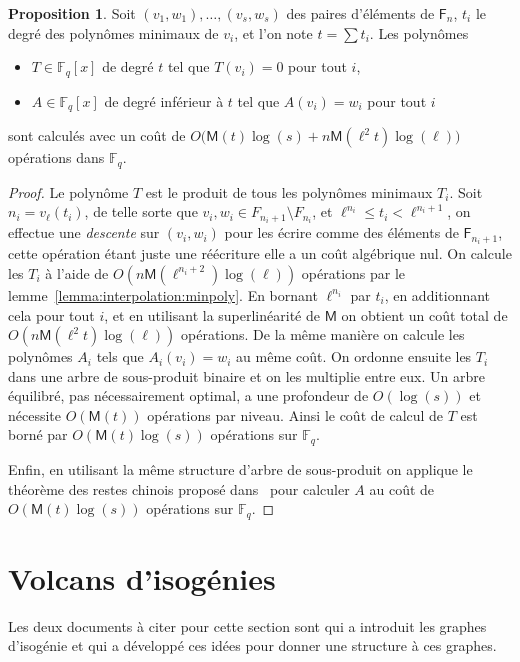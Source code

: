 \documentclass[10pt,a4paper]{book}
\theoremstyle{plain}
\theoremstyle{definition}
\theoremstyle{definition}
\theoremstyle{definition}
\theoremstyle{definition}
\newtheorem{prop}[thm]{Proposition}
\theoremstyle{definition}
\theoremstyle{remark}
\theoremstyle{remark}
\theoremstyle{definition}
\begin{document}
\begin{prop}\label{prop:interpol}
  Soit $(v_1,w_1),\dots,(v_s,w_s)$ des paires d'éléments de $\mathsf{F}_n$, 
  $t_i$ le degré des polynômes minimaux de $v_i$, et l'on note  $t=\sum t_i$. 
  Les polynômes
  \begin{itemize}
  \item $T\in \mathbb{F}_q[x]$ de degré $t$ tel que $T(v_i)=0$ pour tout $i$,
  \item $A\in \mathbb{F}_q[x]$ de degré inférieur à $t$ tel que $A(v_i)=w_i$ pour
    tout $i$
  \end{itemize}
  sont calculés avec un coût de
  $O\bigl(\mathsf{M}(t)\log(s) + n\mathsf{M}(\ell^2t)\log(\ell)\bigr)$ opérations dans $\mathbb{F}_q$.
\end{prop}
\begin{proof}
  Le polynôme $T$ est le produit de tous les polynômes minimaux $T_i$. Soit 
  $n_i=v_\ell(t_i)$, de telle sorte que $v_i,w_i\in F_{n_i+1}\setminus F_{n_i}$,
  et $\ell^{n_i}\leqslant t_i<\ell^{n_i+1}$,
  on effectue une \emph{descente} sur $(v_i,w_i)$ pour les écrire comme des 
  éléments de $\mathsf{F}_{n_i+1}$, cette opération étant juste une réécriture
  elle a un coût algébrique nul. On calcule les $T_i$ à l'aide de
   $O(n\mathsf{M}(\ell^{n_i+2})\log(\ell))$ opérations par 
   le lemme~\ref{lemma:interpolation:minpoly}. En bornant 
  $\ell^{n_i}$ par $t_i$, en additionnant cela pour tout $i$, et en utilisant 
  la superlinéarité de $\mathsf{M}$ on obtient un coût total de 
  $O(n\mathsf{M}(\ell^2t)\log(\ell))$ opérations.
  De la même manière on calcule les polynômes $A_i$ tels que $A_i(v_i)=w_i$
  au même coût.
  On ordonne ensuite les $T_i$ dans une arbre de sous-produit binaire et 
  on les multiplie entre eux. Un arbre équilibré, pas nécessairement optimal,
  a une profondeur de $O(\log (s))$ et nécessite $O(\mathsf{M}(t))$ opérations
   par niveau. Ainsi le coût de calcul de $T$ est borné par 
   $O(\mathsf{M}(t)\log(s))$ opérations sur $\mathbb{F}_q$.
  
  Enfin, en utilisant la même structure d'arbre de sous-produit on applique le 
  théorème des restes chinois proposé dans~\cite[Chapter~10]{vzGJG03} pour 
  calculer $A$ au coût de $O(\mathsf{M}(t)\log(s))$ opérations sur $\mathbb{F}_q$.
\end{proof}




\chapter{Volcans d'isog\'enies}
\label{cha:volc:iso}
Les deux documents à citer pour cette section sont \cite{Kohel96} qui a introduit les graphes d'isogénie et \cite{Fouquet01} qui a développé ces idées pour donner une structure à ces graphes.
\end{document}
